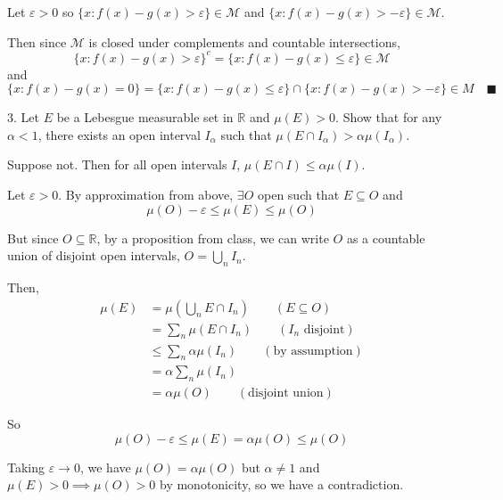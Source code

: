 \documentclass[12pt]{article}
\newcommand{\R}{\mathbb{R}}
\newcommand{\qed}{\quad \blacksquare}
\newcommand{\ep}{\varepsilon}
\newcommand{\M}{\mathcal{M}}
\newcommand{\sub}{\subseteq}
\begin{document}
        Let $\ep > 0$ so $\{x: f(x) - g(x) > \ep\} \in \M$ and $\{x: f(x) - g(x) > -\ep\} \in \M$. 

        Then since $\M$ is closed under complements and countable intersections, 
        \[\{x: f(x) - g(x) > \ep\}^c = \{x: f(x) - g(x) \leq \ep\} \in \M\]
        and 
        \[\{x : f(x) - g(x) = 0\} = \{x : f(x) - g(x) \leq \ep\} \cap \{x: f(x) - g(x) > -\ep\} \in M \qed\]
        
    \color{black}


\pagebreak 

3. Let $E$ be a Lebesgue measurable set in $\R$ and $\mu(E) > 0$. Show that for any $\alpha <1$, there exists an open interval $I_{\alpha}$ such that $\mu(E \cap I_{\alpha}) > \alpha \mu(I_{\alpha})$.

    \color{blue}
        Suppose not. Then for all open intervals $I$, $\mu(E \cap I) \leq \alpha \mu(I)$.

        Let $\ep > 0$. By approximation from above, $\exists O$ open such that $E \sub O$ and 
        \[\mu(O) - \ep \leq \mu(E) \leq \mu(O)\]

        But since $O \sub \R$, by a proposition from class, we can write $O$ as a countable union of disjoint open intervals, $O = \bigcup_{n} I_{n}$.

        Then,
        \begin{align*}
            \mu(E) &= \mu(\bigcup_{n} E \cap I_{n}) \qquad (E \sub O) \\ 
            &= \sum_{n} \mu(E \cap I_{n}) \qquad (I_{n} \text{ disjoint})\\ 
            &\leq \sum_{n} \alpha \mu(I_{n}) \qquad (\text{by assumption})\\
            &= \alpha \sum_n \mu(I_n)\\ 
            &= \alpha \mu(O) \qquad (\text{disjoint union})
        \end{align*}

        So 
        \[\mu(O) - \ep \leq \mu(E) = \alpha \mu(O) \leq \mu(O)\]

        Taking $\ep \to 0$, we have $\mu(O) = \alpha \mu(O)$ but $\alpha \neq 1$ and $\mu(E) > 0 \implies \mu(O) > 0$ by monotonicity, so we have a contradiction. 
    \color{black}
\end{document}
